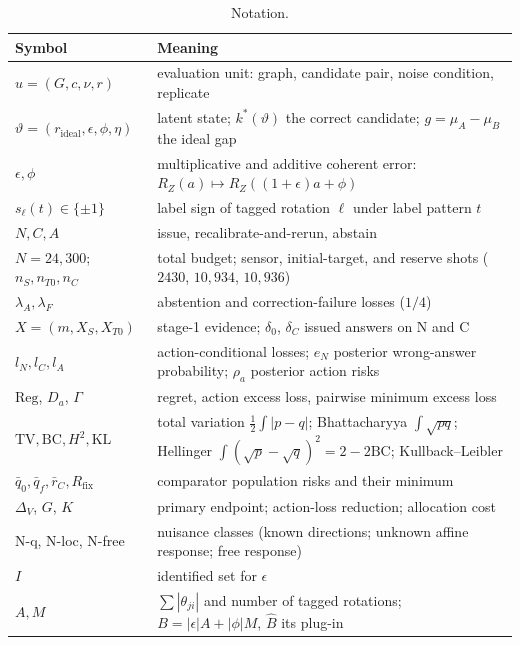 \documentclass[10pt,twocolumn]{article}
\theoremstyle{definition}
\theoremstyle{remark}
\newcommand{\eps}{\epsilon}
\newcommand{\vt}{\vartheta}
\newcommand{\lA}{\lambda_A}
\newcommand{\lF}{\lambda_F}
\newcommand{\TV}{\mathrm{TV}}
\newcommand{\KL}{\mathrm{KL}}
\newcommand{\BC}{\mathrm{BC}}
\newcommand{\RZ}{R_Z}
\newcommand{\DV}{\Delta_V}
\newcommand{\Reg}{\mathrm{Reg}}
\begin{document}
\begin{table}[h]
\centering\small
\caption{Notation.}\label{tab:notation}
\begin{tabularx}{\textwidth}{@{}>{\raggedright\arraybackslash}p{5.2cm}X@{}}
\toprule
Symbol & Meaning \\
\midrule
$u=(G,c,\nu,r)$ & evaluation unit: graph, candidate pair, noise condition, replicate \\
$\vt=(r_{\mathrm{ideal}},\eps,\phi,\eta)$ & latent state; $k^*(\vt)$ the correct candidate; $g=\mu_A-\mu_B$ the ideal gap \\
$\eps,\phi$ & multiplicative and additive coherent error: $\RZ(a)\mapsto\RZ((1+\eps)a+\phi)$ \\
$s_\ell(t)\in\{\pm1\}$ & label sign of tagged rotation $\ell$ under label pattern $t$ \\
$N,C,A$ & issue, recalibrate-and-rerun, abstain \\
$N=24{,}300$; $n_S,n_{T0},n_C$ & total budget; sensor, initial-target, and reserve shots ($2430$, $10{,}934$, $10{,}936$) \\
$\lA,\lF$ & abstention and correction-failure losses ($1/4$) \\
$X=(m,X_S,X_{T0})$ & stage-1 evidence; $\delta_0$, $\delta_C$ issued answers on N and C \\
$l_N,l_C,l_A$ & action-conditional losses; $e_N$ posterior wrong-answer probability; $\rho_a$ posterior action risks \\
$\Reg$, $D_a$, $\Gamma$ & regret, action excess loss, pairwise minimum excess loss \\
$\TV,\BC,H^2,\KL$ & total variation $\tfrac12\int|p-q|$; Bhattacharyya $\int\sqrt{pq}$; Hellinger $\int(\sqrt p-\sqrt q)^2=2-2\BC$; Kullback--Leibler \\
$\bar q_0,\bar q_f,\bar r_C,R_{\mathrm{fix}}$ & comparator population risks and their minimum \\
$\DV$, $G$, $K$ & primary endpoint; action-loss reduction; allocation cost \\
N-q, N-loc, N-free & nuisance classes (known directions; unknown affine response; free response) \\
$I$ & identified set for $\eps$ \\
$A,M$ & $\sum|\theta_{ji}|$ and number of tagged rotations; $B=|\eps|A+|\phi|M$, $\hat B$ its plug-in \\
\bottomrule
\end{tabularx}
\end{table}
\end{document}
